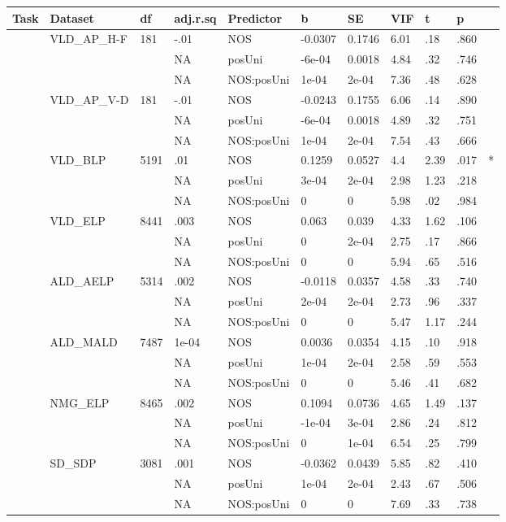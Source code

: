 \begin{table}[ht]
\centering
\begingroup\normalsize
\begin{tabular}{lllllllllll}
  \hline
Task & Dataset & df & adj.r.sq & Predictor & b & SE & VIF & t & p &  \\ 
  \hline
 & VLD\_AP\_H-F & 181 & -.01 & NOS & -0.0307 & 0.1746 & 6.01 & .18 & .860 &   \\ 
   &  &  & NA & posUni & -6e-04 & 0.0018 & 4.84 & .32 & .746 &   \\ 
   &  &  & NA & NOS:posUni & 1e-04 & 2e-04 & 7.36 & .48 & .628 &   \\ 
   & VLD\_AP\_V-D & 181 & -.01 & NOS & -0.0243 & 0.1755 & 6.06 & .14 & .890 &   \\ 
   &  &  & NA & posUni & -6e-04 & 0.0018 & 4.89 & .32 & .751 &   \\ 
   &  &  & NA & NOS:posUni & 1e-04 & 2e-04 & 7.54 & .43 & .666 &   \\ 
   & VLD\_BLP & 5191 & .01 & NOS & 0.1259 & 0.0527 & 4.4 & 2.39 & .017 & * \\ 
   &  &  & NA & posUni & 3e-04 & 2e-04 & 2.98 & 1.23 & .218 &   \\ 
   &  &  & NA & NOS:posUni & 0 & 0 & 5.98 & .02 & .984 &   \\ 
   & VLD\_ELP & 8441 & .003 & NOS & 0.063 & 0.039 & 4.33 & 1.62 & .106 &   \\ 
   &  &  & NA & posUni & 0 & 2e-04 & 2.75 & .17 & .866 &   \\ 
   &  &  & NA & NOS:posUni & 0 & 0 & 5.94 & .65 & .516 &   \\ 
   & ALD\_AELP & 5314 & .002 & NOS & -0.0118 & 0.0357 & 4.58 & .33 & .740 &   \\ 
   &  &  & NA & posUni & 2e-04 & 2e-04 & 2.73 & .96 & .337 &   \\ 
   &  &  & NA & NOS:posUni & 0 & 0 & 5.47 & 1.17 & .244 &   \\ 
   & ALD\_MALD & 7487 & 1e-04 & NOS & 0.0036 & 0.0354 & 4.15 & .10 & .918 &   \\ 
   &  &  & NA & posUni & 1e-04 & 2e-04 & 2.58 & .59 & .553 &   \\ 
   &  &  & NA & NOS:posUni & 0 & 0 & 5.46 & .41 & .682 &   \\ 
   & NMG\_ELP & 8465 & .002 & NOS & 0.1094 & 0.0736 & 4.65 & 1.49 & .137 &   \\ 
   &  &  & NA & posUni & -1e-04 & 3e-04 & 2.86 & .24 & .812 &   \\ 
   &  &  & NA & NOS:posUni & 0 & 1e-04 & 6.54 & .25 & .799 &   \\ 
   & SD\_SDP & 3081 & .001 & NOS & -0.0362 & 0.0439 & 5.85 & .82 & .410 &   \\ 
   &  &  & NA & posUni & 1e-04 & 2e-04 & 2.43 & .67 & .506 &   \\ 
   &  &  & NA & NOS:posUni & 0 & 0 & 7.69 & .33 & .738 &   \\ 
   \hline
\end{tabular}
\endgroup
\end{table}
